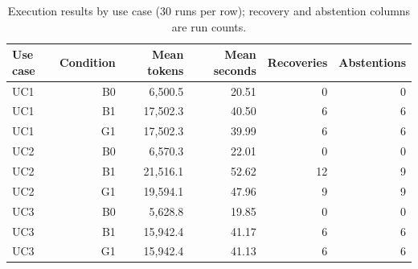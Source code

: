 \begin{table}[!ht]
\centering
\small
\caption[Execution results by use case (30 runs per row); recovery and abstention columns are run counts]{Execution results by use case (30 runs per row); recovery and abstention columns are run counts.}
\label{tab:execution-use-case}
\begin{tabular}{lrrrrr}
\toprule
Use case & Condition & Mean tokens & Mean seconds & Recoveries & Abstentions \\
\midrule
UC1 & B0 & 6,500.5 & 20.51 & 0 & 0 \\
UC1 & B1 & 17,502.3 & 40.50 & 6 & 6 \\
UC1 & G1 & 17,502.3 & 39.99 & 6 & 6 \\
UC2 & B0 & 6,570.3 & 22.01 & 0 & 0 \\
UC2 & B1 & 21,516.1 & 52.62 & 12 & 9 \\
UC2 & G1 & 19,594.1 & 47.96 & 9 & 9 \\
UC3 & B0 & 5,628.8 & 19.85 & 0 & 0 \\
UC3 & B1 & 15,942.4 & 41.17 & 6 & 6 \\
UC3 & G1 & 15,942.4 & 41.13 & 6 & 6 \\
\bottomrule
\end{tabular}
\end{table}
